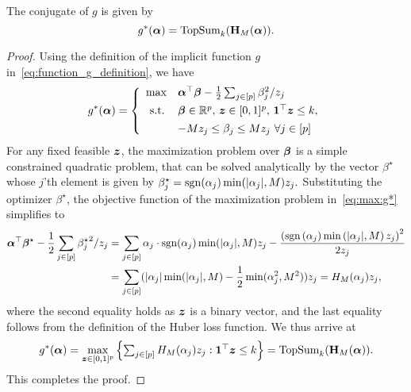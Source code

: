 \begin{namedlemma}
    [~\ref{lemma:fenchel_conjugate_of_g_closed_form_expression}]
    The conjugate of $g$ is given by
    \begin{equation*}
        g^*(\bm{\alpha}) = \operatorname{TopSum}_k({\bf H}_M(\bm{\alpha})).
    \end{equation*}
\end{namedlemma}

\begin{proof}
    Using the definition of the implicit function $g$ in~\eqref{eq:function_g_definition}, we have
    \begin{align}
        \label{eq:max:g*}
        g^*(\bm{\alpha}) = \left\{
        \begin{array}{cl}
            \max & \bm{\alpha}^\top \bm{\beta} -  \frac{1}{2} \sum_{j \in [p]} {\beta_j^2}/{z_j} \\[1ex]
            \operatorname{s.\!t.\!} & \bm{\beta} \in \mathbb{R}^p, \, \bm{z} \in [0, 1]^p, \, \bm 1^\top \bm{z} \leq k, \\[1ex]
            & -M z_j \leq \beta_j \leq M z_j ~ \forall j \in [p]
        \end{array}
        \right.
    \end{align}
    For any fixed feasible $\bm{z}$, the maximization problem over $\bm{\beta}$ is a simple constrained quadratic problem, that can be solved analytically by the vector $\beta^\star$ whose $j$'th element is given by
    $\beta_j^\star = \operatorname{sgn}(\alpha_j) \min(\lvert \alpha_j \rvert, M) z_j.$
    Substituting the optimizer $\beta^\star$, the objective function of the maximization problem in~\eqref{eq:max:g*} simplifies to
    \begin{align*}
        \balpha^\top \bbeta^\star - \frac{1}{2} \sum_{j \in [p]} {\beta_j^\star}^2 / z_j 
        &= \sum_{j \in [p]} \alpha_j \cdot \sgn(\alpha_j) \min(\vert{\alpha_j}, M) z_j - \frac{\left( \sgn\left( \alpha_j \right) \min\left(\vert{\alpha_j}, M \right) z_j \right)^2}{2z_j} \\
        &= \sum_{j \in [p]} ( \vert{\alpha_j} \min(\vert{\alpha_j}, M) - \frac{1}{2} \min(\alpha_j^2, M^2) ) z_j %
        = H_M(\alpha_j) z_j,
    \end{align*}
    where the second equality holds as $\bm{z}$ is a binary vector, and the last equality follows from the definition of the Huber loss function. We thus arrive at
    \begin{align*}
        g^*(\bm{\alpha}) = \max_{\bm{z} \in [0,1]^p} \left\{ \textstyle \sum_{j \in [p]} H_M (\alpha_j) z_j: \bm 1^\top \bm{z} \leq k \right\} = \operatorname{TopSum}_k ({\mathbf{H}}_M(\bm{\alpha})).
    \end{align*}
    This completes the proof.
\end{proof}

